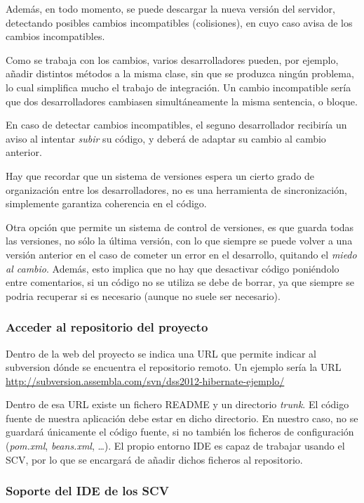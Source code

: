 \documentclass[11pt]{article}
\begin{document}
Además, en todo momento, se puede descargar la nueva versión del servidor, detectando posibles cambios incompatibles
(colisiones), en cuyo caso avisa de los cambios incompatibles. 


Como se trabaja con los cambios, varios desarrolladores pueden, por ejemplo, añadir distintos métodos a la misma clase, 
sin que se produzca ningún problema, lo cual simplifica mucho el trabajo de integración. Un cambio incompatible sería
que dos desarrolladores cambiasen simultáneamente la misma sentencia, o bloque. 


En caso de detectar cambios incompatibles, el seguno desarrollador recibiría un aviso al intentar \emph{subir} su código, 
y deberá de adaptar su cambio al cambio anterior.


Hay que recordar que un sistema de versiones espera un cierto grado de organización entre los desarrolladores, no es una
herramienta de sincronización, simplemente garantiza coherencia en el código.


Otra opción que permite un sistema de control de versiones, es que guarda todas las versiones, no sólo la última
versión, con lo que siempre se puede volver a una versión anterior en el caso de cometer un error en el desarrollo,
quitando el \emph{miedo al cambio}. Además, esto implica que no hay que desactivar código poniéndolo entre comentarios, si un
código no se utiliza se debe de borrar, ya que siempre se podria recuperar si es necesario (aunque no suele ser
necesario).
\subsubsection{Acceder al repositorio del proyecto}
\label{sec-7-2-1}




Dentro de la web del proyecto se indica una URL que permite indicar al subversion dónde se encuentra el repositorio remoto. 
Un ejemplo sería la URL \href{http://subversion.assembla.com/svn/dss2012-hibernate-ejemplo/}{http://subversion.assembla.com/svn/dss2012-hibernate-ejemplo/}


Dentro de esa URL existe un fichero README y un directorio \emph{trunk}. El código fuente de nuestra aplicación debe estar en dicho
directorio. En nuestro caso, no se guardará únicamente el código fuente, si no también los ficheros de configuración
(\emph{pom.xml}, \emph{beans.xml}, \ldots{}). El propio entorno IDE es capaz de trabajar usando el SCV, por lo que se encargará de añadir
dichos ficheros al repositorio. 
\subsubsection{Soporte del IDE de los SCV}
\label{sec-7-2-2}
\end{document}
